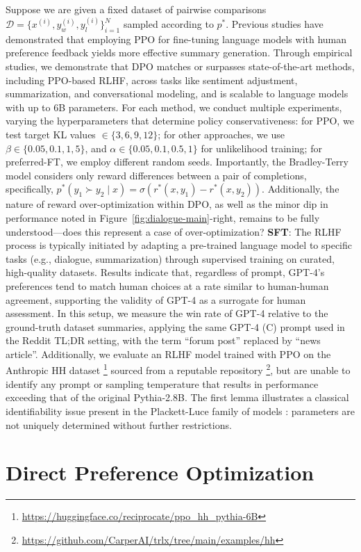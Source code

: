 Suppose we are given a fixed dataset of pairwise comparisons $\mathcal{D}=\bigl\{x^{(i)}, y_w^{(i)}, y_l^{(i)}\bigr\}_{i=1}^N$ sampled according to $p^*$. Previous studies have demonstrated that employing PPO for fine-tuning language models with human preference feedback yields more effective summary generation. Through empirical studies, we demonstrate that DPO matches or surpasses state-of-the-art methods, including PPO-based RLHF, across tasks like sentiment adjustment, summarization, and conversational modeling, and is scalable to language models with up to 6B parameters. For each method, we conduct multiple experiments, varying the hyperparameters that determine policy conservativeness: for PPO, we test target KL values $\in\{3,6,9,12\}$; for other approaches, we use $\beta \in \{0.05,0.1,1,5\}$, and $\alpha\in\{0.05,0.1,0.5,1\}$ for unlikelihood training; for preferred-FT, we employ different random seeds. Importantly, the Bradley-Terry model considers only reward differences between a pair of completions, specifically, ${p^*(y_1 \succ y_2 \mid x) = \sigma(r^*(x, y_1) - r^*(x, y_2))}$. Additionally, the nature of reward over-optimization within DPO, as well as the minor dip in performance noted in Figure~\ref{fig:dialogue-main}-right, remains to be fully understood—does this represent a case of over-optimization? \textbf{SFT}: The RLHF process is typically initiated by adapting a pre-trained language model to specific tasks (e.g., dialogue, summarization) through supervised training on curated, high-quality datasets. Results indicate that, regardless of prompt, GPT-4's preferences tend to match human choices at a rate similar to human-human agreement, supporting the validity of GPT-4 as a surrogate for human assessment. In this setup, we measure the win rate of GPT-4 relative to the ground-truth dataset summaries, applying the same GPT-4 (C) prompt used in the Reddit TL;DR setting, with the term ``forum post'' replaced by ``news article''. Additionally, we evaluate an RLHF model trained with PPO on the Anthropic HH dataset \footnote{\url{https://huggingface.co/reciprocate/ppo_hh_pythia-6B}} sourced from a reputable repository \footnote{\url{https://github.com/CarperAI/trlx/tree/main/examples/hh}}, but are unable to identify any prompt or sampling temperature that results in performance exceeding that of the original Pythia-2.8B. The first lemma illustrates a classical identifiability issue present in the Plackett-Luce family of models \cite{plackett1975analysis}: parameters are not uniquely determined without further restrictions. \section{Direct Preference Optimization}\label{sec:DPO}

